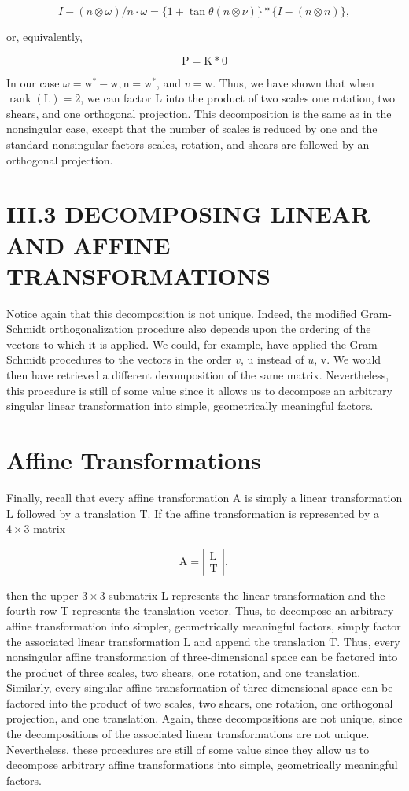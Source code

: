 $$
I-(n \otimes \omega) / n \cdot \omega=\{1+\tan \theta(n \otimes \nu)\} *\{I-(n \otimes n)\},
$$

or, equivalently,

$$
\mathrm{P}=\mathrm{K} * 0
$$

In our case $\omega=\mathrm{w}^{*}-\mathrm{w}, \mathrm{n}=\mathrm{w}^{*}$, and $v=\mathrm{w}$. Thus, we have shown that when $\operatorname{rank}(\mathrm{L})=2$, we can factor L into the product of two scales one rotation, two shears, and one orthogonal projection. This decomposition is the same as in the nonsingular case, except that the number of scales is reduced by one and the standard nonsingular factors-scales, rotation, and shears-are followed by an orthogonal projection.

\section{III.3 DECOMPOSING LINEAR AND AFFINE TRANSFORMATIONS}
Notice again that this decomposition is not unique. Indeed, the modified Gram-Schmidt orthogonalization procedure also depends upon the ordering of the vectors to which it is applied. We could, for example, have applied the Gram-Schmidt procedures to the vectors in the order $v$, u instead of $u$, v. We would then have retrieved a different decomposition of the same matrix. Nevertheless, this procedure is still of some value since it allows us to decompose an arbitrary singular linear transformation into simple, geometrically meaningful factors.

\section{Affine Transformations}
Finally, recall that every affine transformation A is simply a linear transformation $\mathrm{L}$ followed by a translation $\mathrm{T}$. If the affine transformation is represented by a $4 \times 3$ matrix

$$
\mathrm{A}=\left|\begin{array}{l}
\mathrm{L} \\
\mathrm{T}
\end{array}\right|,
$$

then the upper $3 \times 3$ submatrix L represents the linear transformation and the fourth row $\mathrm{T}$ represents the translation vector. Thus, to decompose an arbitrary affine transformation into simpler, geometrically meaningful factors, simply factor the associated linear transformation L and append the translation T. Thus, every nonsingular affine transformation of three-dimensional space can be factored into the product of three scales, two shears, one rotation, and one translation. Similarly, every singular affine transformation of three-dimensional space can be factored into the product of two scales, two shears, one rotation, one orthogonal projection, and one translation. Again, these decompositions are not unique, since the decompositions of the associated linear transformations are not unique. Nevertheless, these procedures are still of some value since they allow us to decompose arbitrary affine transformations into simple, geometrically meaningful factors.

